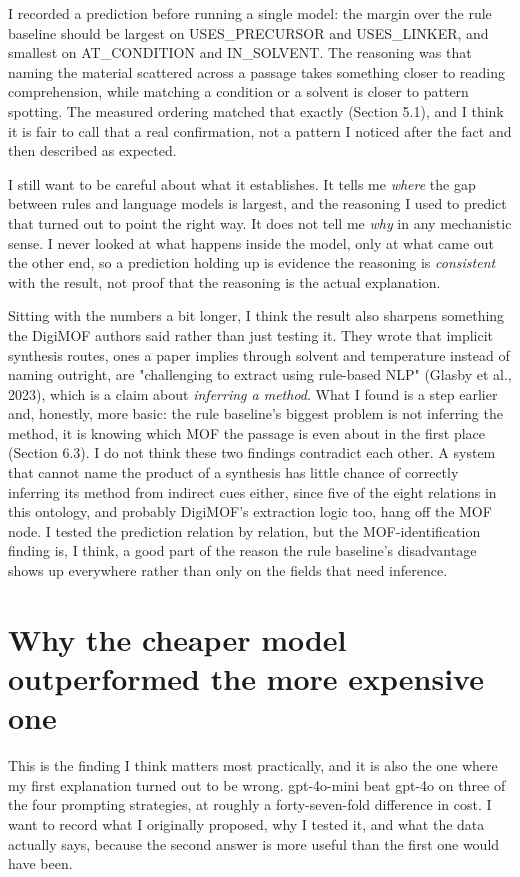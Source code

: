 \documentclass[11pt,a4paper,oneside]{report}
\begin{document}
I recorded a prediction before running a single model: the margin over the rule baseline should be largest on USES\_PRECURSOR and USES\_LINKER, and smallest on AT\_CONDITION and IN\_SOLVENT. The reasoning was that naming the material scattered across a passage takes something closer to reading comprehension, while matching a condition or a solvent is closer to pattern spotting. The measured ordering matched that exactly (Section 5.1), and I think it is fair to call that a real confirmation, not a pattern I noticed after the fact and then described as expected.

I still want to be careful about what it establishes. It tells me \emph{where} the gap between rules and language models is largest, and the reasoning I used to predict that turned out to point the right way. It does not tell me \emph{why} in any mechanistic sense. I never looked at what happens inside the model, only at what came out the other end, so a prediction holding up is evidence the reasoning is \emph{consistent} with the result, not proof that the reasoning is the actual explanation.

Sitting with the numbers a bit longer, I think the result also sharpens something the DigiMOF authors said rather than just testing it. They wrote that implicit synthesis routes, ones a paper implies through solvent and temperature instead of naming outright, are "challenging to extract using rule-based NLP" (Glasby et al., 2023), which is a claim about \emph{inferring a method}. What I found is a step earlier and, honestly, more basic: the rule baseline's biggest problem is not inferring the method, it is knowing which MOF the passage is even about in the first place (Section 6.3). I do not think these two findings contradict each other. A system that cannot name the product of a synthesis has little chance of correctly inferring its method from indirect cues either, since five of the eight relations in this ontology, and probably DigiMOF's extraction logic too, hang off the MOF node. I tested the prediction relation by relation, but the MOF-identification finding is, I think, a good part of the reason the rule baseline's disadvantage shows up everywhere rather than only on the fields that need inference.

\section{Why the cheaper model outperformed the more expensive one}

This is the finding I think matters most practically, and it is also the one where my first explanation turned out to be wrong. gpt-4o-mini beat gpt-4o on three of the four prompting strategies, at roughly a forty-seven-fold difference in cost. I want to record what I originally proposed, why I tested it, and what the data actually says, because the second answer is more useful than the first one would have been.
\end{document}
